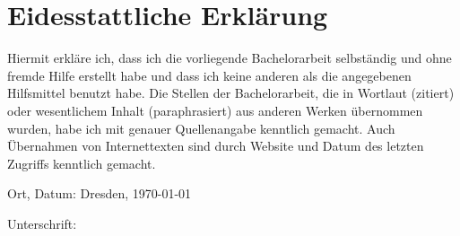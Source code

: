 \chapter*{Eidesstattliche Erklärung}

Hiermit erkläre ich, dass ich die vorliegende Bachelorarbeit selbständig und ohne fremde Hilfe
erstellt habe und dass ich keine anderen als die angegebenen Hilfsmittel benutzt habe. Die
Stellen der Bachelorarbeit, die in Wortlaut (zitiert) oder wesentlichem Inhalt (paraphrasiert)
aus anderen Werken übernommen wurden, habe ich mit genauer Quellenangabe kenntlich
gemacht. Auch Übernahmen von Internettexten sind durch Website und Datum des letzten
Zugriffs kenntlich gemacht.

\vspace{2em}

Ort, Datum: Dresden, \today{}

Unterschrift: